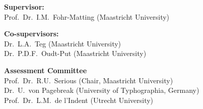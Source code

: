 \thispagestyle{empty}
\raggedright        %
\vspace*{3cm}

\noindent\textbf{Supervisor:}\\
Prof.\ Dr.\ I.M.\ Fohr-Matting (Maastricht University)

\bigskip

\noindent\textbf{Co-supervisors:}\\
Dr.\ L.A.\ Teg (Maastricht University)\\
Dr.\ P.D.F.\ Oudt-Put (Maastricht University)

\bigskip

\noindent\textbf{Assessment Committee}\\
Prof.\ Dr.\ R.U.\ Serious (Chair, Maastricht University)\\
Dr.\ U.\ von Pagebreak (University of Typhographia, Germany)\\
Prof.\ Dr.\ L.M.\ de l'Indent (Utrecht University)\\

\vfill
\clearpage

